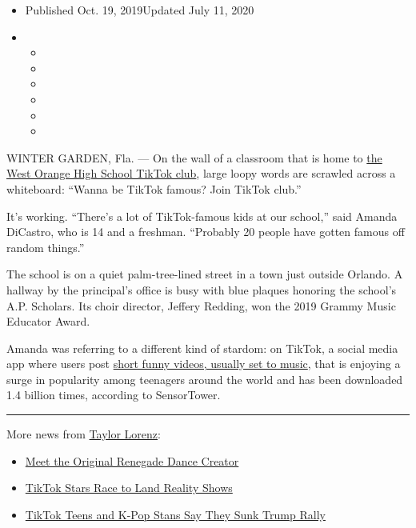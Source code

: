 \begin{itemize}
\item
  Published Oct. 19, 2019Updated July 11, 2020
\item
  \begin{itemize}
  \item
  \item
  \item
  \item
  \item
  \item
  \end{itemize}
\end{itemize}

WINTER GARDEN, Fla. --- On the wall of a classroom that is home to
\href{http://vm.tiktok.com/5qoKE6/}{the West Orange High School TikTok
club}, large loopy words are scrawled across a whiteboard: ``Wanna be
TikTok famous? Join TikTok club.''

It's working. ``There's a lot of TikTok-famous kids at our school,''
said Amanda DiCastro, who is 14 and a freshman. ``Probably 20 people
have gotten famous off random things.''

The school is on a quiet palm-tree-lined street in a town just outside
Orlando. A hallway by the principal's office is busy with blue plaques
honoring the school's A.P. Scholars. Its choir director, Jeffery
Redding, won the 2019 Grammy Music Educator Award.

Amanda was referring to a different kind of stardom: on TikTok, a social
media app where users post
\href{https://www.nytimes3xbfgragh.onion/2019/03/10/style/what-is-tik-tok.html}{short
funny videos, usually set to music}, that is enjoying a surge in
popularity among teenagers around the world and has been downloaded 1.4
billion times, according to SensorTower.

\begin{center}\rule{0.5\linewidth}{\linethickness}\end{center}

More news from
\href{https://www.nytimes3xbfgragh.onion/by/taylor-lorenz}{Taylor
Lorenz}:

\begin{itemize}
\item
  \href{https://www.nytimes3xbfgragh.onion/2020/02/13/style/the-original-renegade.html}{Meet
  the Original Renegade Dance Creator}
\item
  \href{https://www.nytimes3xbfgragh.onion/2020/07/09/style/tiktok-stars-race-to-land-reality-shows.html}{TikTok
  Stars Race to Land Reality Shows}
\item
  \href{https://www.nytimes3xbfgragh.onion/2020/06/21/style/tiktok-trump-rally-tulsa.html}{TikTok
  Teens and K-Pop Stans Say They Sunk Trump Rally}
\end{itemize}

